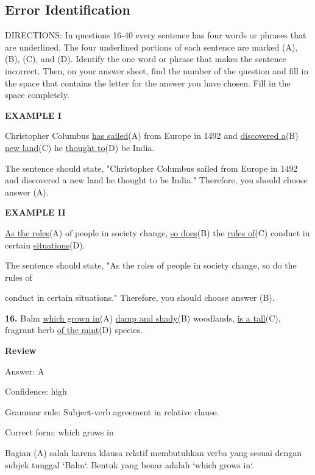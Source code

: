 \documentclass[12pt]{article}
\begin{document}
\subsection*{Error Identification}
DIRECTIONS: In questions 16-40 every sentence has four words or phrases that are underlined. The four underlined portions of each sentence are marked (A), (B), (C), and (D). Identify the one word or phrase that makes the sentence incorrect. Then, on your answer sheet, find the number of the question and fill in the space that contains the letter for the answer you have chosen. Fill in the space completely.\par
\begin{exampleblock}
\textbf{EXAMPLE I}\par
Christopher Columbus \uline{has sailed}(A) from Europe in 1492 and \uline{discovered a}(B) \uline{new land}(C) he \uline{thought to}(D) be India.\par
The sentence should state, "Christopher Columbus sailed from Europe in 1492 and discovered a new land he thought to be India." Therefore, you should choose answer (A).\par
\end{exampleblock}
\begin{exampleblock}
\textbf{EXAMPLE II}\par
\uline{As the roles}(A) of people in society change, \uline{so does}(B) the \uline{rules of}(C) conduct in certain \uline{situations}(D).\par
The sentence should state, "As the roles of people in society change, so do the rules of\par
conduct in certain situations." Therefore, you should choose answer (B).\par
\end{exampleblock}
\noindent\textbf{16.} Balm \uline{which grown in}(A) \uline{damp and shady}(B) woodlands, \uline{is a tall}(C), fragrant herb \uline{of the mint}(D) species.
\par
\begingroup
\setlength{\parskip}{0pt}
\setlength{\parindent}{0pt}
\textbf{Review}\par
Answer: A\par
Confidence: high\par
Grammar rule: Subject-verb agreement in relative clause.\par
Correct form: which grows in\par
Bagian (A) salah karena klausa relatif membutuhkan verba yang sesuai dengan subjek tunggal `Balm`. Bentuk yang benar adalah `which grows in`.\par
\end{document}
